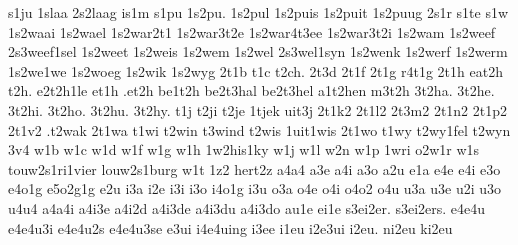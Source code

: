 {%
s1ju
1slaa
2s2laag
is1m
s1pu
1s2pu.
1s2pul
1s2puis
1s2puit
1s2puug
2s1r
s1te
s1w
1s2waai
1s2wael
1s2war2t1
1s2war3t2e
1s2war4t3ee
1s2war3t2i
1s2wam
1s2weef
2s3weef1sel
1s2weet
1s2weis
1s2wem
1s2wel
2s3wel1syn
1s2wenk
1s2werf
1s2werm
1s2we1we
1s2woeg
1s2wik
1s2wyg
%
%
%
2t1b
t1c
t2ch.
2t3d
2t1f
2t1g
r4t1g
2t1h
eat2h
t2h.
e2t2h1le
et1h
.et2h
be1t2h
be2t3hal
be2t3hel
a1t2hen
m3t2h
3t2ha.
3t2he.
3t2hi.
3t2ho.
3t2hu.
3t2hy.
%
t1j
t2ji
t2je
1tjek
uit3j
2t1k2
2t1l2
2t3m2
2t1n2
2t1p2
2t1v2
.t2wak
2t1wa
t1wi
t2win
t3wind
t2wis
1uit1wis
2t1wo
t1wy
t2wy1fel
t2wyn
%
3v4
%
w1b
w1c
w1d
w1f
w1g
w1h
1w2his1ky
w1j
w1l
w2n
w1p
1wri
o2w1r
w1s
touw2s1ri1vier
louw2s1burg
w1t
%
%
%
1z2
hert2z
%
%
%
a4a4
a3e
a4i
a3o
a2u
%
e1a
e4e
e4i
e3o
e4o1g
e5o2g1g
e2u
%
i3a
i2e
i3i
i3o
i4o1g
i3u
%
o3a
o4e
o4i
o4o2
o4u
%
u3a
u3e
u2i
u3o
u4u4
%
a4a4i
a4i3e
a4i2d
a4i3de
a4i3du
a4i3do
au1e
%
ei1e
s3ei2er.
s3ei2ers.
%
e4e4u
e4e4u3i
e4e4u2s
e4e4u3se
%
e3ui
i4e4uing
%
i3ee
i1eu
i2e3ui
i2eu.
ni2eu
ki2eu
}
